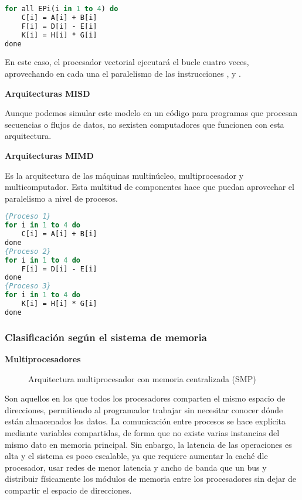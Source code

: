 \begin{lstlisting}[language=Pascal]
for all EPi(i in 1 to 4) do
	C[i] = A[i] + B[i]
	F[i] = D[i] - E[i]
	K[i] = H[i] * G[i]
done
\end{lstlisting}

En este caso, el procesador vectorial ejecutará el bucle  cuatro veces, aprovechando en cada una el paralelismo de las instrucciones ,  y .

\textbf{Arquitecturas MISD}

Aunque podemos simular este modelo en un código para programas que procesan secuencias o flujos de datos, no sexisten computadores que funcionen con esta arquitectura.

\textbf{Arquitecturas MIMD}

Es la arquitectura de las máquinas multinúcleo, multiprocesador y multicomputador.
Esta multitud de componentes hace que puedan aprovechar el paralelismo a nivel de procesos.

\pagebreak

\begin{lstlisting}[language=Pascal]
{Proceso 1}
for i in 1 to 4 do
	C[i] = A[i] + B[i]
done
{Proceso 2}
for i in 1 to 4 do
	F[i] = D[i] - E[i]
done
{Proceso 3}
for i in 1 to 4 do
	K[i] = H[i] * G[i]
done
\end{lstlisting}

\subsubsection{Clasificación según el sistema de memoria}

\textbf{Multiprocesadores}

\begin{figure}[h]
\begin{center}

\end{center}
\caption{Arquitectura multiprocesador con memoria centralizada (SMP)}
\end{figure}

Son aquellos en los que todos los procesadores comparten el mismo espacio de direcciones, permitiendo al programador trabajar sin necesitar conocer dónde están almacenados los datos.
La comunicación entre procesos se hace explícita mediante variables compartidas, de forma que no existe varias instancias del mismo dato en memoria principal.
Sin enbargo, la latencia de las operaciones es alta y el sistema es poco escalable, ya que requiere aumentar la caché dle procesador, usar redes de menor latencia y ancho de banda que un bus y distribuir físicamente los módulos de memoria entre los procesadores sin dejar de compartir el espacio de direcciones.

